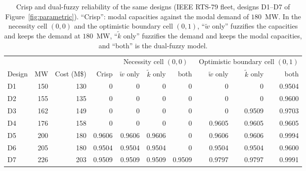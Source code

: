 \begin{table}[!htbp]
\providecommand{\revtablecolor}{}\revtablecolor
\centering
\caption{Crisp and dual-fuzzy reliability of the same designs (IEEE RTS-79 fleet, designs D1--D7 of Figure~\ref{fig:parametric}). ``Crisp'': modal capacities against the modal demand of $180$~MW. In the necessity cell $(0,0)$ and the optimistic boundary cell $(0,1)$, ``$\tilde{w}$ only'' fuzzifies the capacities and keeps the demand at $180$~MW, ``$\tilde{k}$ only'' fuzzifies the demand and keeps the modal capacities, and ``both'' is the dual-fuzzy model. }
\label{tab:crisp_vs_fuzzy}
\footnotesize
\setlength{\tabcolsep}{4pt}
\begin{tabular}{lrrrrrrrrr}
\hline
 & & & & \multicolumn{3}{c}{Necessity cell $(0,0)$} & \multicolumn{3}{c}{Optimistic boundary cell $(0,1)$}\\
Design & MW & Cost (M\$) & Crisp & $\tilde{w}$ only & $\tilde{k}$ only & both & $\tilde{w}$ only & $\tilde{k}$ only & both\\
\hline
D1 & 150 & 130 & 0 & 0 & 0 & 0 & 0 & 0 & 0.9504 \\
D2 & 155 & 135 & 0 & 0 & 0 & 0 & 0 & 0 & 0.9600 \\
D3 & 162 & 149 & 0 & 0 & 0 & 0 & 0 & 0.9509 & 0.9703 \\
D4 & 176 & 158 & 0 & 0 & 0 & 0 & 0.9605 & 0.9605 & 0.9605 \\
D5 & 200 & 180 & 0.9606 & 0.9606 & 0.9606 & 0 & 0.9606 & 0.9606 & 0.9994 \\
D6 & 205 & 180 & 0.9504 & 0.9504 & 0.9504 & 0 & 0.9504 & 0.9504 & 0.9600 \\
D7 & 226 & 203 & 0.9509 & 0.9509 & 0.9509 & 0.9509 & 0.9797 & 0.9797 & 0.9991 \\
\hline
\end{tabular}
\end{table}
